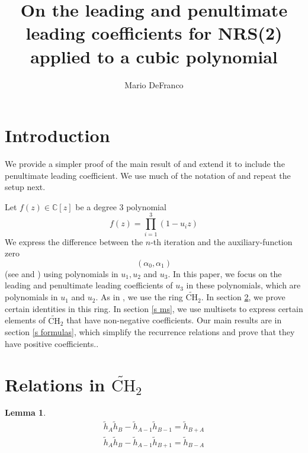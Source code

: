 \documentclass[11pt, oneside]{article}   	%
\newtheorem{lemma}{Lemma}
\newcommand{\ti}{\tilde{h}}
\newcommand{\tCH}{\tilde{\mathrm{CH}}_2}
\begin{document}
\title{On the leading and penultimate leading  coefficients for NRS(2) applied to a cubic polynomial}
\author{Mario DeFranco}

\maketitle


\section{Introduction}

We provide a simpler proof of the main result of \cite{DeFranco} and extend it to include the penultimate leading coefficient. We use much of the notation of \cite{DeFranco} and repeat the setup next. 

Let $f(z) \in \mathbb{C}[z]$ be a degree 3 polynomial 
\[
f(z) = \prod_{i=1}^3 (1-u_iz)
\]
We express the difference between the $n$-th iteration and the auxiliary-function zero
\[
(\alpha_0, \alpha_1)
\]
(see \cite{DeFranco 1} and \cite{DeFranco 2}) using polynomials in $u_1, u_2$ and $u_3$. In this paper, we focus on the leading and penultimate leading coefficients of $u_3$ in these polynomials, which are polynomials in $u_1$ and $u_2$. As in \cite{DeFranco}, we use the ring $\tCH$. In section \ref{s ch identities}, we prove certain identities in this ring. In section \ref{s ms}, we use multisets to express certain elements of $\tCH$ that have non-negative coefficients. Our main results are in section \ref{s formulas}, which simplify the recurrence relations and prove that they have positive coefficients.. 

\section{Relations in $\tilde{\mathrm{CH}}_2$} \label{s ch identities}

\begin{lemma} \label{l hab}
\begin{align}
\ti_A \ti_B - \ti_{A-1} \ti_{B-1} = \ti_{B+A} \label{11}\\ 
\ti_A \ti_B - \ti_{A-1} \ti_{B+1} =\ti_{B-A} \label{1m1}
\end{align}
\end{lemma} 
\end{document}
